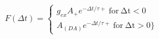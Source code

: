  $F(\Delta t) =  \begin{cases} g_{ex} A_{+} e^{−\Delta t/τ+}\:\mathrm{for\:\Delta t <0}\\A_ (DA) e^{−\Delta t/τ+}\:\mathrm{for\:\Delta t > 0}\} \end{cases}$
 